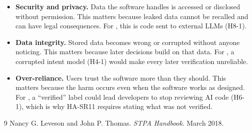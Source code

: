 \documentclass{article}
\begin{document}
\begin{enumerate}
    \begin{itemize}
      \item \textbf{Security and privacy.} Data the software handles is
      accessed or disclosed without permission. This matters because leaked
      data cannot be recalled and can have legal consequences. For
      \progname{}, this is code sent to external LLMs (H8-1).
      \item \textbf{Data integrity.} Stored data becomes wrong or corrupted
      without anyone noticing. This matters because later decisions build on
      that data. For \progname{}, a corrupted intent model (H4-1) would make
      every later verification unreliable.
      \item \textbf{Over-reliance.} Users trust the software more than they
      should. This matters because the harm occurs even when the software
      works as designed. For \progname{}, a ``verified'' label could lead
      developers to stop reviewing AI code (H6-1), which is why HA-SR11 requires
      stating what was not verified.
    \end{itemize}
\end{enumerate}

\begin{thebibliography}{9}
Nancy G. Leveson and John P. Thomas.
\newblock \emph{STPA Handbook}.
\newblock March 2018.
\end{thebibliography}
\end{document}
